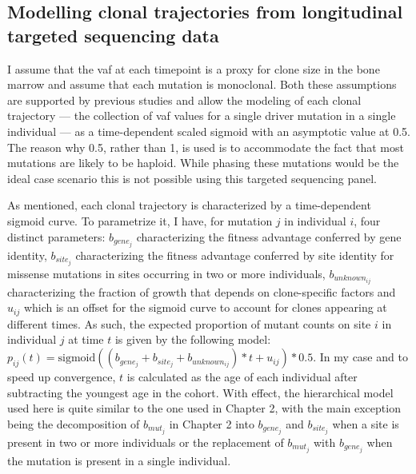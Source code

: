 \begin{figure}[!ht]
	\label{fig:study-design-ch}
\end{figure}

\subsection{Modelling clonal trajectories from longitudinal targeted sequencing data}

I assume that the \ac{vaf} at each timepoint is a proxy for clone size in the bone marrow and assume that each mutation is monoclonal. Both these assumptions are supported by previous studies \cite{Miles2020-fz,Lee2020-yp,Hwang2018-tp} and allow the modeling of each clonal trajectory --- the collection of \ac{vaf} values for a single driver mutation in a single individual --- as a time-dependent scaled sigmoid with an asymptotic value at 0.5. The reason why 0.5, rather than 1, is used is to accommodate the fact that most mutations are likely to be haploid. While phasing these mutations would be the ideal case scenario this is not possible using this targeted sequencing panel.

As mentioned, each clonal trajectory is characterized by a time-dependent sigmoid curve. To parametrize it, I have, for mutation $j$ in individual $i$, four distinct parameters: $b_{gene_j}$ characterizing the fitness advantage conferred by gene identity, $b_{site_j}$ characterizing the fitness advantage conferred by site identity for missense mutations in sites occurring in two or more individuals, $b_{unknown_{ij}}$ characterizing the fraction of growth that depends on clone-specific factors and $u_{ij}$ which is an offset for the sigmoid curve to account for clones appearing at different times. As such, the expected proportion of mutant counts on site $i$ in individual $j$ at time $t$ is given by the following model: $p_{ij}(t)=\mathrm{sigmoid}((b_{gene_j}+b_{site_j}+b_{unknown_{ij}})*t + u_{ij})*0.5$. In my case and to speed up convergence, $t$ is calculated as the age of each individual after subtracting the youngest age in the cohort. With effect, the hierarchical model used here is quite similar to the one used in Chapter 2, with the main exception being the decomposition of $b_{mut_j}$ in Chapter 2 into $b_{gene_j}$ and $b_{site_j}$ when a site is present in two or more individuals or the replacement of $b_{mut_j}$ with $b_{gene_j}$ when the mutation is present in a single individual.

